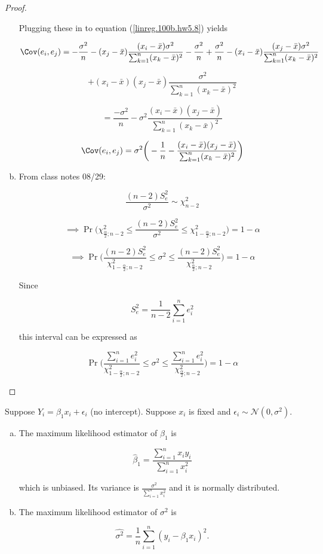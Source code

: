 \begin{proof}
\begin{enumerate}[(a)]
Plugging these in to equation (\ref{linreg.100b.hw5.8}) yields


\[
\Cov(e_i, e_j)  = -\frac{\sigma^2}{n} - ( x_j - \bar{x})\frac{(x_i - \bar{x})\sigma^2}{\sum_{k=1}^n(x_k - \bar{x})^2} -\frac{\sigma^2}{n} + \frac{\sigma^2}{n}  - ( x_i - \bar{x}) \frac{(x_j - \bar{x})\sigma^2}{\sum_{k=1}^n(x_k - \bar{x})^2} 
\]

\[
+ (x_i - \bar{x})(x_j - \bar{x})\frac{\sigma^2}{\sum_{k=1}^n(x_k - \bar{x})^2}
\]

\[
= \frac{-\sigma^2 }{n} - \sigma^2\frac{ (x_i -\bar{x})(x_j - \bar{x})}{\sum_{k=1}^n(x_k - \bar{x})^2} 
\]

\[
\Cov(e_i, e_j)  = \sigma^2\bigg(-\frac{1}{n} - \frac{ (x_i -\bar{x})(x_j - \bar{x})}{\sum_{k=1}^n(x_k - \bar{x})^2} \bigg)
\]


\item From class notes 08/29:

\[
\frac{(n-2)S_e^2}{\sigma^2} \sim \chi^2_{n-2}
\]

\[
\implies \Pr \bigg( \chi_{\frac{\alpha}{2};  n-2}^2 \leq \frac{(n-2)S_e^2}{\sigma^2}  \leq  \chi_{1 - \frac{ \alpha}{2}; n-2}^2 \bigg) = 1 - \alpha
\]

\[
\implies \boxed{ \Pr \bigg( \frac{(n-2)S_e^2}{\chi_{1 - \frac{\alpha}{2}; n-2}^2}  \leq \sigma^2  \leq  \frac{(n-2)S_e^2}{\chi_{\frac{\alpha}{2}; n-2}^2}  \bigg) = 1 - \alpha }
\]

Since 

\[
S_e^2 = \frac{1}{n-2}\sum_{i=1}^n e_i^2
\]

this interval can be expressed as 

\[
 \Pr \bigg( \frac{\sum_{i=1}^n e_i^2}{\chi_{1 - \frac{\alpha}{2}; n-2}^2}  \leq \sigma^2  \leq  \frac{\sum_{i=1}^n e_i^2}{\chi_{\frac{\alpha}{2}; n-2}^2}  \bigg) = 1 - \alpha 
\]

\end{enumerate}

\end{proof}


\begin{proposition}Suppose \(Y_i = \beta_1 x_i + \epsilon_i\) (no intercept). Suppose \(x_i\) is fixed and \(\epsilon_i \sim \mathcal{N}(0, \sigma^2)\).

\begin{enumerate}[(a)]

\item The maximum likelihood estimator of \(\beta_1\) is

\[
\hat{\beta}_1 = \frac{\sum_{i=1}^n x_i y_i }{\sum_{i=1}^n x_i^2}
\]

which is unbiased. Its variance is \( \frac{\sigma^2}{\sum_{i=1}^n x_i^2}\) and it is normally distributed.

\item The maximum likelihood estimator of \(\sigma^2\) is 

\[
\hat{\sigma^2} = \frac{1}{n}\sum_{i=1}^n (y_i - \beta_1 x_i)^2 .
\]

\end{enumerate}

\end{proposition}

